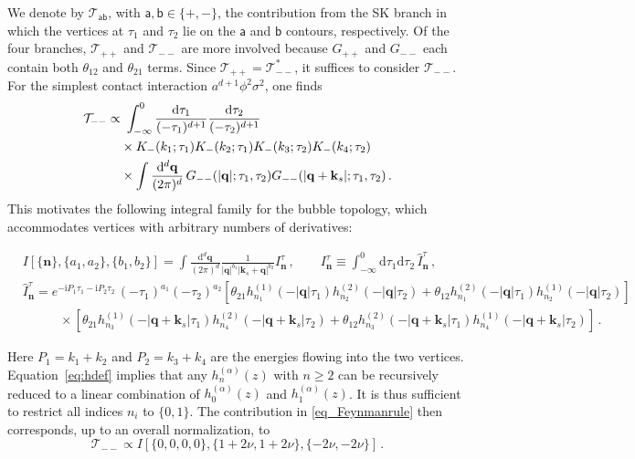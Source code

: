 \documentclass[%
 reprint,
 amsmath,amssymb,
 aps,
prd,
]{revtex4-2}
\newcommand{\n}{\nonumber}
\def\ie{\begin{equation}\begin{aligned}}
\def\fe{\end{aligned}\end{equation}}
\def\di{{\mathrm{d}}}
\def\mb{\mathbf}
\def\ii{\mathrm{i}}
\begin{document}
We denote by \(\mathcal T_{\mathsf a\mathsf b}\), with \(\mathsf a,\mathsf b\in\{+,-\}\), the contribution from the SK branch in which the vertices at \(\tau_1\) and \(\tau_2\) lie on the \(\mathsf a\) and \(\mathsf b\) contours, respectively. Of the four branches, \(\mathcal T_{++}\) and \(\mathcal T_{--}\) are more involved because \(G_{++}\) and \(G_{--}\) each contain both \(\theta_{12}\) and \(\theta_{21}\) terms. Since \(\mathcal T_{++}=\mathcal T_{--}^*\), it suffices to consider \(\mathcal T_{--}\). For the simplest contact interaction \(a^{d+1}\phi^2\sigma^2\), one finds
\begin{align}\label{eq_Feynmanrule}
\mathcal T_{--} \propto&~ \int_{-\infty}^0 \frac{\di \tau_1}{(-\tau_1)^{d+1}}\frac{\di \tau_2}{(-\tau_2)^{d+1}} \notag\\
&\times K_-(k_1;\tau_1)K_-(k_2;\tau_1)K_-(k_3;\tau_2)K_-(k_4;\tau_2) \notag\\
&\times \int \frac{\di^d\mb q}{(2\pi)^d}\,G_{--}(|\mb q|;\tau_1,\tau_2)G_{--}(|\mb q+\mb k_s|;\tau_1,\tau_2)\,.
\end{align}
This motivates the following integral family for the bubble topology, which accommodates vertices with arbitrary numbers of derivatives:
\begin{widetext}
\ie\label{eq_Idef2}
&I[\{\bm n\},\{a_1,a_2\},\{b_1,b_2\}]
=\int \frac{\di^d \mb q}{(2\pi)^d}
\frac{1}{|\mb q|^{b_1}|\mb k_s+\mb q|^{b_2}} I^{\tau}_{\bm n} \,,\quad\quad I^{\tau}_{\bm n} \equiv \int_{-\infty}^0 \di\tau_1\di\tau_2\,\hat{I}^{\tau}_{\bm n} \,, \n \\
& \hat{I}^{\tau}_{\bm n}=e^{-\ii P_1\tau_1 - \ii P_2 \tau_2}\,(-\tau_1)^{a_1}(-\tau_2)^{a_2} \left[ \theta_{21}h_{n_1}^{(1)}(-|\mb q|\tau_1)h_{n_2}^{(2)}(-|\mb q|\tau_2)
+\theta_{12}h_{n_1}^{(2)}(-|\mb q|\tau_1)h_{n_2}^{(1)}(-|\mb q|\tau_2)\right] \\
&~~~~~~~~~~~~~\times \left[\theta_{21}h_{n_3}^{(1)}(-|\mb q+\mb k_s|\tau_1)h_{n_4}^{(2)}(-|\mb q+\mb k_s|\tau_2)
+\theta_{12}h_{n_3}^{(2)}(-|\mb q+\mb k_s|\tau_1)h_{n_4}^{(1)}(-|\mb q+\mb k_s|\tau_2)\right]\,. 
\fe
\end{widetext}

Here \(P_1=k_1+k_2\) and \(P_2=k_3+k_4\) are the energies flowing into the two vertices. Equation~\eqref{eq:hdef} implies that any \(h_n^{(\alpha)}(z)\) with \(n\ge 2\) can be recursively reduced to a linear combination of \(h_{0}^{(\alpha)}(z)\) and \(h_{1}^{(\alpha)}(z)\). It is thus sufficient to restrict all indices \(n_i\) to \(\{0,1\}\). The contribution in \eqref{eq_Feynmanrule} then corresponds, up to an overall normalization, to
\begin{equation}\label{eq_TinI}
\mathcal T_{--} \propto I[\{0,0,0,0\},\{1+2\nu,1+2\nu\},\{-2\nu,-2\nu\}]\,.
\end{equation}
\end{document}
